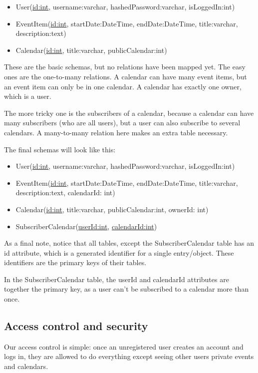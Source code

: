 \documentclass[10pt]{report}
\numberwithin{equation}{section} %
\numberwithin{figure}{section} %
\numberwithin{table}{section} %
\begin{document}
\begin{itemize}
\item User(\underline{id:int}, username:varchar, hashedPassword:varchar, isLoggedIn:int)
\item EventItem(\underline{id:int}, startDate:DateTime, endDate:DateTime, title:varchar, description:text)
\item Calendar(\underline{id:int}, title:varchar, publicCalendar:int)
\end{itemize}

These are the basic schemas, but no relations have been mapped yet. The easy ones are the one-to-many relations. A calendar can have many event items, but an event item can only be in one calendar. A calendar has exactly one owner, which is a user.


The more tricky one is the subscribers of a calendar, because a calendar can have many subscribers (who are all users), but a user can also subscribe to several calendars. A many-to-many relation here makes an extra table necessary.


The final schemas will look like this:

\begin{itemize}
\item User(\underline{id:int}, username:varchar, hashedPassword:varchar, isLoggedIn:int)
\item EventItem(\underline{id:int}, startDate:DateTime, endDate:DateTime, title:varchar, description:text, calendarId: int)
\item Calendar(\underline{id:int}, title:varchar, publicCalendar:int, ownerId: int)
\item SubscriberCalendar(\underline{userId:int}, \underline{calendarId:int})
\end{itemize}

As a final note, notice that all tables, except the SubscriberCalendar table has an id attribute, which is a generated identifier for a single entry/object. These identifiers are the primary keys of their tables.


In the SubscriberCalendar table, the userId and calendarId attributes are together the primary key, as a user can't be subscribed to a calendar more than once.

\subsection{Access control and security}
Our access control is simple: once an unregistered user creates an account and
logs in, they are allowed to do everything except seeing other users private
events and calendars.
\end{document}
